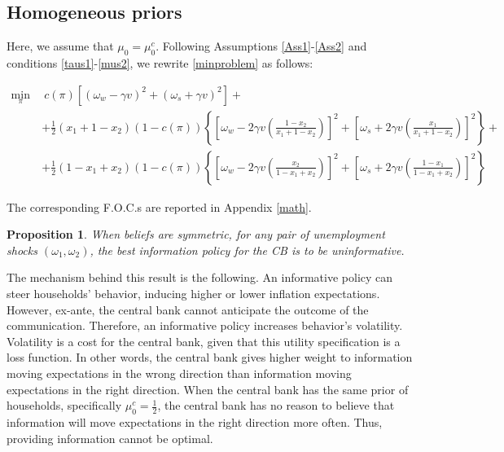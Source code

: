 \documentclass[12pt,a4paper]{article}
\newtheorem{proposition}{Proposition}
\begin{document}
\subsection{Homogeneous priors}

Here, we assume that $\mu_0=\mu_0^c$. Following Assumptions \ref{Ass1}-\ref{Ass2} and conditions \eqref{taus1}-\eqref{mus2}, we rewrite \eqref{minproblem} as follows:
\begin{small}
    \begin{equation}
    \begin{split}
    \min_{\pi} \ & \ c(\pi)\left[(\omega_w-\gamma v)^2+(\omega_s+\gamma v)^2\right]+\\
     &  +\frac{1}{2}(x_1 + 1-x_2)(1-c(\pi))\left\{\left[\omega_w-2\gamma v\left(\frac{1-x_2}{x_1+1-x_2}\right)\right]^2+\left[\omega_s+2\gamma v\left(\frac{x_1}{x_1+1-x_2}\right)\right]^2\right\}+ \\
     & +\frac{1}{2}(1-x_1 + x_2)(1-c(\pi))\left\{\left[\omega_w-2\gamma v\left(\frac{x_2}{1-x_1+x_2}\right)\right]^2+\left[\omega_s+2\gamma v\left(\frac{1-x_1}{1-x_1+x_2}\right)\right]^2\right\}
    \end{split}
    \end{equation}
\end{small}
The corresponding F.O.C.s are reported in Appendix \ref{math}.

\begin{proposition}
    When beliefs are symmetric, for any pair of unemployment shocks $(\omega_1,\omega_2)$, the best information policy for the CB is to be uninformative.
\end{proposition}
The mechanism behind this result is the following. An informative policy can steer households' behavior, inducing higher or lower inflation expectations. However, ex-ante, the central bank cannot anticipate the outcome of the communication. Therefore, an informative policy increases behavior's volatility. Volatility is a cost for the central bank, given that this utility specification is a loss function. In other words, the central bank gives higher weight to information moving expectations in the wrong direction than information moving expectations in the right direction. When the central bank has the same prior of households, specifically $\mu_0^c=\frac{1}{2}$, the central bank has no reason to believe that information will move expectations in the right direction more often. Thus, providing information cannot be optimal.
\end{document}
